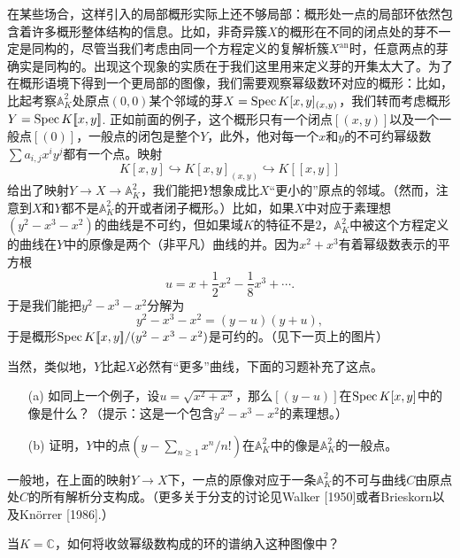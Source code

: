 在某些场合，这样引入的局部概形实际上还不够局部：概形处一点的局部环依然包含着许多概形整体结构的信息。比如，非奇异簇$X$的概形在不同的闭点处的芽不一定是同构的，尽管当我们考虑由同一个方程定义的复解析簇$X^{\text{an}}$时，任意两点的芽确实是同构的。出现这个现象的实质在于我们这里用来定义芽的开集太大了。为了在概形语境下得到一个更局部的图像，我们需要观察幂级数环对应的概形：比如，比起考察$\mathbb{A}_K^2$处原点$(0,0)$某个邻域的芽$X=\operatorname{Spec} K[x,y]_{(x,y)}$，我们转而考虑概形$Y=\operatorname{Spec} K [\![x,y]\!]$. 正如前面的例子，这个概形只有一个闭点$[(x,y)]$以及一个一般点$[(0)]$，一般点的闭包是整个$Y$，此外，他对每一个$x$和$y$的不可约幂级数$\sum a_{i,j}x^iy^j$都有一个点。映射
\[
	K[x,y]\hookrightarrow K[x,y]_{(x,y)}\hookrightarrow K[\![x,y]\!]
\]
给出了映射$Y\to X\to \mathbb{A}_K^2$，我们能把$Y$想象成比$X$“更小的”原点的邻域。（然而，注意到$X$和$Y$都不是$\mathbb{A}_K^2$的开或者闭子概形。）比如，如果$X$中对应于素理想$(y^2-x^3-x^2)$的曲线是不可约，但如果域$K$的特征不是$2$，$\mathbb{A}_K^2$中被这个方程定义的曲线在$Y$中的原像是两个（非平凡）曲线的并。因为$x^2+x^3$有着幂级数表示的平方根
\[
	u=x+\frac{1}{2}x^2-\frac{1}{8}x^3+\cdots.
\]
于是我们能把$y^2-x^3-x^2$分解为
\[
	y^2-x^3-x^2=(y-u)(y+u),
\]
于是概形$\operatorname{Spec}  K[\![x,y]\!]/(y^2-x^3-x^2)$是可约的。（见下一页上的图片）


当然，类似地，$Y$比起$X$必然有“更多”曲线，下面的习题补充了这点。

\begin{exe}
	\begin{itemize}\setlength{\itemsep}{0pt}
		\item[(a)] 如同上一个例子，设$u=\sqrt{x^2+x^3}$，那么$[(y-u)]$在$\operatorname{Spec} K[x,y]$中的像是什么？（提示：这是一个包含$y^2-x^3-x^2$的素理想。）
		\item[(b)] 证明，$Y$中的点$(y-\sum_{n\geq 1}x^n/n!)$在$\mathbb{A}_K^2$中的像是$\mathbb{A}_K^2$的一般点。
	\end{itemize}
\end{exe}

一般地，在上面的映射$Y\to X$下，一点的原像对应于一条$\mathbb{A}_K^2$的不可与曲线$C$由原点处$C$的所有解析分支构成。（更多关于分支的讨论见Walker [1950]或者Brieskorn以及Kn\"{o}rrer [1986].）

\begin{exe}
	当$K=\mathbb{C}$，如何将收敛幂级数构成的环的谱纳入这种图像中？
\end{exe}